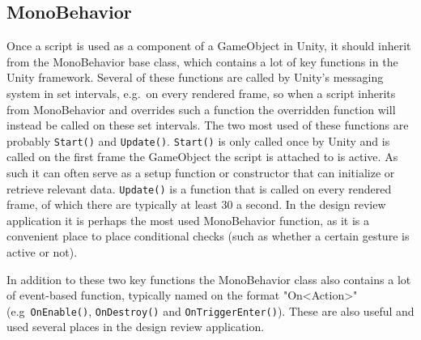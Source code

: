\subsection{MonoBehavior}
Once a script is used as a component of a GameObject in Unity, it should inherit from the MonoBehavior base class, which contains a lot of key functions in the Unity framework.
Several of these functions are called by Unity's messaging system in set intervals, e.g.~on every rendered frame, so when a script inherits from MonoBehavior and overrides such a
function the overridden function will instead be called on these set intervals. The two most used of these functions are probably \texttt{Start()} and \texttt{Update()}.
\texttt{Start()} is only called once by Unity and is called on the first frame the GameObject the script is attached to is active. As such it can often 
serve as a setup function or constructor that can initialize or retrieve relevant data. \texttt{Update()} is a function that is called on every rendered frame, 
of which there are typically at least 30 a second. In the design review application it is perhaps the most used MonoBehavior function, as it is 
a convenient place to place conditional checks (such as whether a certain gesture is active or not).

In addition to these two key functions the MonoBehavior class also contains a lot of event-based function, typically named on the format "On<Action>" (e.g~\texttt{OnEnable()}, 
\texttt{OnDestroy()} and \texttt{OnTriggerEnter()}). These are also useful and used several places in the design review application.


